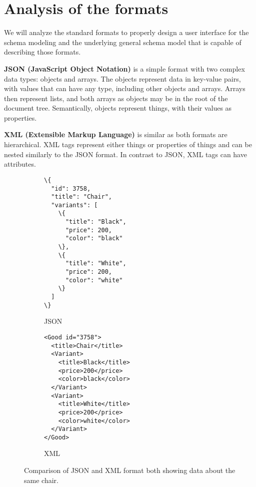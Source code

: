 \section*{Analysis of the formats}

We will analyze the standard formats to properly design a user interface for the schema modeling and the underlying general schema model that is capable of describing those formats.

\textbf{JSON (JavaScript Object Notation)} is a simple format with two complex data types: objects and arrays. The objects represent data in key-value pairs, with values that can have any type, including other objects and arrays. Arrays then represent lists, and both arrays as objects may be in the root of the document tree. Semantically, objects represent things, with their values as properties.

\textbf{XML (Extensible Markup Language)} is similar as both formats are hierarchical. XML tags represent either things or properties of things and can be nested similarly to the JSON format. In contrast to JSON, XML tags can have attributes.

\begin{figure}[h!]\centering
    \begin{subfigure}[b]{.5\textwidth}
\begin{Verbatim}[commandchars=\\\{\}]
\{
  "id": 3758,
  "title": "Chair",
  "variants": [
    \{
      "title": "Black",
      "price": 200,
      "color": "black"
    \},
    \{
      "title": "White",
      "price": 200,
      "color": "white"
    \}
  ]
\}
\end{Verbatim}
        \caption{JSON}
      \end{subfigure}%
      \begin{subfigure}[b]{.5\textwidth}
\begin{Verbatim}[commandchars=\\\{\}]
<Good id="3758">
  <title>Chair</title>
  <Variant>
    <title>Black</title>
    <price>200</price>
    <color>black</color>
  </Variant>
  <Variant>
    <title>White</title>
    <price>200</price>
    <color>white</color>
  </Variant>
</Good>
\end{Verbatim}

\vfill

        \caption{XML}
      \end{subfigure}
    \caption{Comparison of JSON and XML format both showing data about the same chair.}
    \label{analysis/xml-json}
\end{figure}

